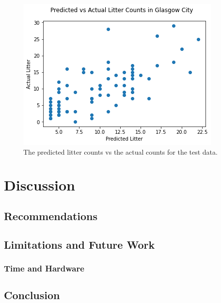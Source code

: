 \documentclass{thesis}
\begin{document}
\begin{figure}[h]
    \centering
    \includegraphics[scale=0.75]{images/predicted-vs-actual-test.png}
    \caption{The predicted litter counts vs the actual counts for the test data.}
    \label{fig:predicted-vs-actual-test}
\end{figure}


\chapter{Discussion}


\section{Recommendations}

\section{Limitations and Future Work}

\subsection{Time and Hardware}



\section{Conclusion}

\end{document}
